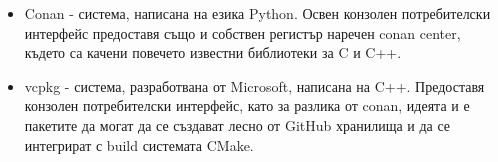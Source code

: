 \begin{itemize}
    \item Conan - система, написана на езика Python. Освен конзолен
          потребителски интерфейс предоставя също и собствен регистър наречен
          conan center, където са качени повечето известни библиотеки за C и
          C++.
    \item vcpkg - система, разработвана от Microsoft, написана на C++.
          Предоставя конзолен потребителски интерфейс, като за разлика от conan,
          идеята и е пакетите да могат да се създават лесно от GitHub хранилища
          и да се интегрират с build системата CMake.
\end{itemize}
